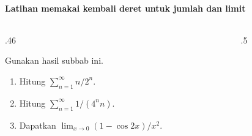 \documentclass{../../kalkulus-ppt}
\begin{document}
\begin{frame}{\insertsection}
    \framesubtitle{Latihan memakai kembali deret untuk jumlah dan limit}
    \begin{columns}[T,onlytextwidth]
        \begin{column}{.46\textwidth}
            \begin{latihan}
                Gunakan hasil subbab ini.
                \begin{enumerate}
                    \item Hitung $\sum_{n=1}^\infty n/2^n$.
                    \item Hitung $\sum_{n=1}^\infty 1/(4^n n)$.
                    \item Dapatkan $\lim_{x\to0}(1-\cos 2x)/x^2$.
                \end{enumerate}
            \end{latihan}
        \end{column}
        \begin{column}{.5\textwidth}
        \end{column}
    \end{columns}
\end{frame}
\end{document}
